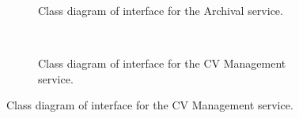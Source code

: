 \documentclass[12pt]{article}
\begin{document}
\begin{figure}[H]
\begin{subfigure}[p]{0.47\textwidth}
\centering	
{}
\caption{Class diagram of interface for the Archival service.}
\end{subfigure}
~
\begin{subfigure}[p]{0.47\textwidth}
\centering	
{}
\caption{Class diagram of interface for the CV Management service.}
\end{subfigure}


\end{figure}
\end{document}
